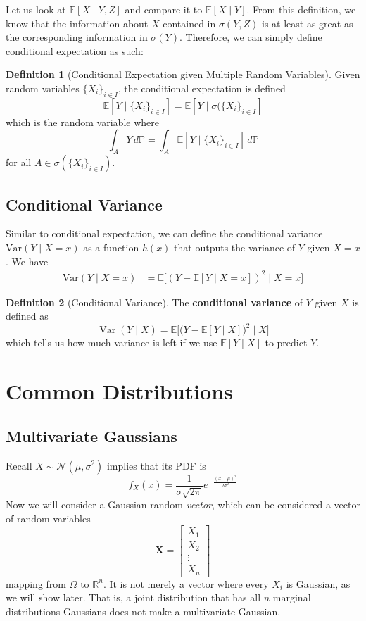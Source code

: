 \documentclass{article}
\DeclareMathOperator{\Var}{Var}
\theoremstyle{definition}
\theoremstyle{remark}
\theoremstyle{definition}
\newtheorem{definition}{Definition}[section]
\begin{document}
Let us look at $\mathbb{E}[X \mid Y, Z]$ and compare it to $\mathbb{E}[X \mid Y]$. From this definition, we know that the information about $X$ contained in $\sigma(Y, Z)$ is at least as great as the corresponding information in $\sigma(Y)$. Therefore, we can simply define conditional expectation as such: 

\begin{definition}[Conditional Expectation given Multiple Random Variables]
Given random variables $\{X_i\}_{i \in I}$, the conditional expectation is defined 
\[\mathbb{E}[Y \mid \{X_i\}_{i \in I} ] = \mathbb{E}[ Y \mid \sigma(\{X_i \}_{i \in I} ]\]
which is the random variable where 
\[\int_A Y \, d\mathbb{P} = \int_A \mathbb{E}[Y \mid \{X_i\}_{i \in I} ] \, d\mathbb{P}\]
for all $A \in \sigma(\{X_i \}_{i \in I})$. 
\end{definition}

\subsection{Conditional Variance}

Similar to conditional expectation, we can define the conditional variance $\mathrm{Var}(Y \mid X = x)$ as a function $h(x)$ that outputs the variance of $Y$ given $X = x$. We have
\begin{align*}
    \mathrm{Var}(Y \mid X = x) & = \mathbb{E}\big[ ( Y - \mathbb{E}[Y \mid X = x] )^2 \mid X = x \big]
\end{align*}

\begin{definition}[Conditional Variance]
The \textbf{conditional variance} of $Y$ given $X$ is defined as 
\[\Var(Y \mid X) = \mathbb{E} \big[ \big( Y - \mathbb{E}[Y \mid X] \big)^2 \mid X \big] \]
which tells us how much variance is left if we use $\mathbb{E}[Y \mid X]$ to predict $Y$. 
\end{definition}





\section{Common Distributions}

\subsection{Multivariate Gaussians}

Recall $X \sim \mathcal{N}(\mu, \sigma^2)$ implies that its PDF is 
\[f_X (x) = \frac{1}{\sigma \sqrt{2 \pi}} e^{-\frac{(x - \mu)^2}{2 \sigma^2}}\]
Now we will consider a Gaussian random \textit{vector}, which can be considered a vector of random variables  
\[\mathbf{X} = \begin{bmatrix} X_1 \\ X_2 \\ \vdots \\ X_n \end{bmatrix}\]
mapping from $\Omega$ to $\mathbb{R}^n$. It is not merely a vector where every $X_i$ is Gaussian, as we will show later. That is, a joint distribution that has all $n$ marginal distributions Gaussians does not make a multivariate Gaussian. 
\end{document}
